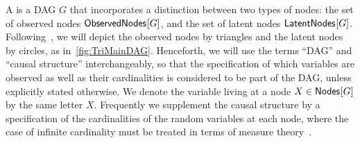 A  is a DAG $G$ that incorporates a distinction between two types of nodes: the set of observed nodes ${\operatorname{\mathsf{ObservedNodes}}_{}}\lbrack G\rbrack$, and the set of latent nodes ${\operatorname{\mathsf{LatentNodes}}_{}}\lbrack G\rbrack$.  %
Following~\cite{pusey2014gdag}, we will depict the observed nodes by triangles and the latent nodes by circles, as in~\cref{fig:TriMainDAG}.
Henceforth, we will use the terms ``DAG'' and ``causal structure'' interchangeably, so that the specification of which variables are observed as well as their cardinalities is considered to be part of the DAG, unless explicitly stated otherwise. We denote the variable living at a node $X\in{\operatorname{\mathsf{Nodes}}_{}}\lbrack G\rbrack$ by the same letter $X$. Frequently we supplement the causal structure by a specification of the cardinalities of the random variables at each node, where the case of infinite cardinality must be treated in terms of measure theory~\cite[App.~A]{BeyondBellII}.

